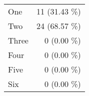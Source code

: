 \begin{tabular}{ l  r }
One & 11 (31.43 \%)\\
Two & 24 (68.57 \%)\\
Three & 0 (0.00 \%)\\
Four & 0 (0.00 \%)\\
Five & 0 (0.00 \%)\\
Six & 0 (0.00 \%)\\
\end{tabular}
